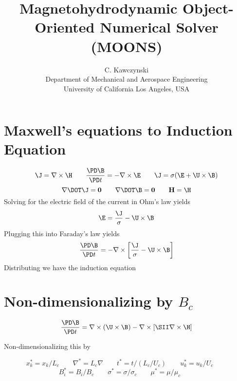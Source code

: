 \documentclass[11pt]{article}
\begin{document}
\doublespacing
\title{Magnetohydrodynamic Object-Oriented Numerical Solver (MOONS)}
\author{C. Kawczynski \\
Department of Mechanical and Aerospace Engineering \\
University of California Los Angeles, USA\\
}
\maketitle

\section{Maxwell's equations to Induction Equation}
\begin{equation}
	\J = \nabla \times \H
	\qquad
	\frac{\PD \B}{\PD t} =
	- \nabla \times \E
	\qquad
	\J = \sigma (\E + \U \times \B)
\end{equation}
\begin{equation}
	\nabla \DOT \J = \mathbf{0}
	\qquad
	\nabla \DOT \B = \mathbf{0}
	\qquad
	\mathbf{H} = \H
\end{equation}
Solving for the electric field of the current in Ohm's law yields
\begin{equation}
	\E = \frac{\J}{\sigma} - \U \times \B
\end{equation}
Plugging this into Faraday's law yields
\begin{equation}
	\frac{\PD \B}{\PD t} =
	- \nabla \times \left[ \frac{\J}{\sigma}
	- \U \times \B \right]
\end{equation}
Distributing we have the induction equation

\section{Non-dimensionalizing by \texorpdfstring{$B_c$}{LG}}

\begin{equation}
	\frac{\PD \B}{\PD t} =
	\nabla \times (\U \times \B)
	- \nabla \times
	\left[ \SII
	\nabla \times \H \right]
\end{equation}

Non-dimensionalizing this by

\begin{equation*}
	x_k^* = x_k/L_c \qquad
	\nabla^* = L_c \nabla \qquad
	t^* = t/(L_c/U_c) \qquad
	u_k^* = u_k/U_c \qquad
	\end{equation*}
	\begin{equation*}
	B_i^* = B_i/B_c  \qquad
	\sigma^* = \sigma/\sigma_c \qquad
	\mu^* = \mu/\mu_c \qquad
\end{equation*}
\end{document}
